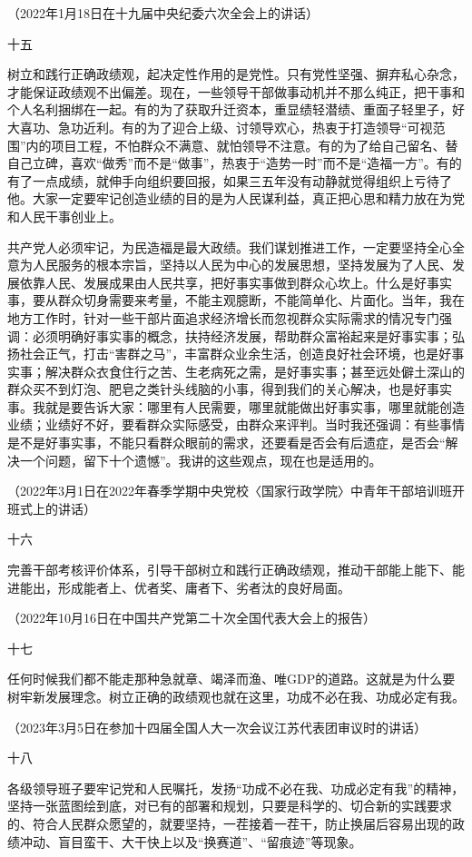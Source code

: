 \documentclass[UTF8,zihao=-4]{ctexart}
\begin{document}
（2022年1月18日在十九届中央纪委六次全会上的讲话）

十五

树立和践行正确政绩观，起决定性作用的是党性。只有党性坚强、摒弃私心杂念，才能保证政绩观不出偏差。现在，一些领导干部做事动机并不那么纯正，把干事和个人名利捆绑在一起。有的为了获取升迁资本，重显绩轻潜绩、重面子轻里子，好大喜功、急功近利。有的为了迎合上级、讨领导欢心，热衷于打造领导“可视范围”内的项目工程，不怕群众不满意、就怕领导不注意。有的为了给自己留名、替自己立碑，喜欢“做秀”而不是“做事”，热衷于“造势一时”而不是“造福一方”。有的有了一点成绩，就伸手向组织要回报，如果三五年没有动静就觉得组织上亏待了他。大家一定要牢记创造业绩的目的是为人民谋利益，真正把心思和精力放在为党和人民干事创业上。

共产党人必须牢记，为民造福是最大政绩。我们谋划推进工作，一定要坚持全心全意为人民服务的根本宗旨，坚持以人民为中心的发展思想，坚持发展为了人民、发展依靠人民、发展成果由人民共享，把好事实事做到群众心坎上。什么是好事实事，要从群众切身需要来考量，不能主观臆断，不能简单化、片面化。当年，我在地方工作时，针对一些干部片面追求经济增长而忽视群众实际需求的情况专门强调：必须明确好事实事的概念，扶持经济发展，帮助群众富裕起来是好事实事；弘扬社会正气，打击“害群之马”，丰富群众业余生活，创造良好社会环境，也是好事实事；解决群众衣食住行之苦、生老病死之需，是好事实事；甚至远处僻土深山的群众买不到灯泡、肥皂之类针头线脑的小事，得到我们的关心解决，也是好事实事。我就是要告诉大家：哪里有人民需要，哪里就能做出好事实事，哪里就能创造业绩；业绩好不好，要看群众实际感受，由群众来评判。当时我还强调：有些事情是不是好事实事，不能只看群众眼前的需求，还要看是否会有后遗症，是否会“解决一个问题，留下十个遗憾”。我讲的这些观点，现在也是适用的。

（2022年3月1日在2022年春季学期中央党校〈国家行政学院〉中青年干部培训班开班式上的讲话）

十六

完善干部考核评价体系，引导干部树立和践行正确政绩观，推动干部能上能下、能进能出，形成能者上、优者奖、庸者下、劣者汰的良好局面。

（2022年10月16日在中国共产党第二十次全国代表大会上的报告）

十七

任何时候我们都不能走那种急就章、竭泽而渔、唯GDP的道路。这就是为什么要树牢新发展理念。树立正确的政绩观也就在这里，功成不必在我、功成必定有我。

（2023年3月5日在参加十四届全国人大一次会议江苏代表团审议时的讲话）

十八

各级领导班子要牢记党和人民嘱托，发扬“功成不必在我、功成必定有我”的精神，坚持一张蓝图绘到底，对已有的部署和规划，只要是科学的、切合新的实践要求的、符合人民群众愿望的，就要坚持，一茬接着一茬干，防止换届后容易出现的政绩冲动、盲目蛮干、大干快上以及“换赛道”、“留痕迹”等现象。
\end{document}
